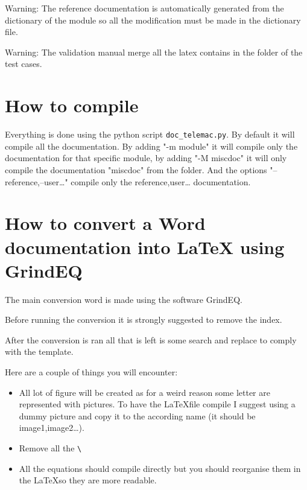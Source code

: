 \begin{WarningBlock}{Warning:}
The reference documentation is automatically generated from the dictionary of
the module so all the modification must be made in the dictionary file.
\end{WarningBlock}

\begin{WarningBlock}{Warning:}
The validation manual merge all the latex contains in the  folder
of the test cases.
\end{WarningBlock}

\section{How to compile}

Everything is done using the python script \verb!doc_telemac.py!. By default it will
compile all the documentation. By adding "-m module" it will compile only the
documentation for that specific module, by adding "-M miscdoc" it will only
compile the documentation "miscdoc" from the  folder. And the
options "--reference,--user\ldots" compile only the reference,user\ldots
documentation.

\section{How to convert a Word documentation into LaTeX using GrindEQ}

The main conversion word is made using the software GrindEQ.

Before running the conversion it is strongly suggested to remove the index.

After the conversion is ran all that is left is some search and replace to
comply with the template.

Here are a couple of things you will encounter:
\begin{itemize}
\item All lot of figure will be created as for a weird reason some letter are
represented with pictures. To have the \LaTeX file compile I suggest using a
dummy picture and copy it to the according name (it should be
image1,image2\ldots).
\item  Remove all the \verb!\!
\item All the equations should compile directly but you should reorganise them
in the \LaTeX so they are more readable.
\end{itemize}
